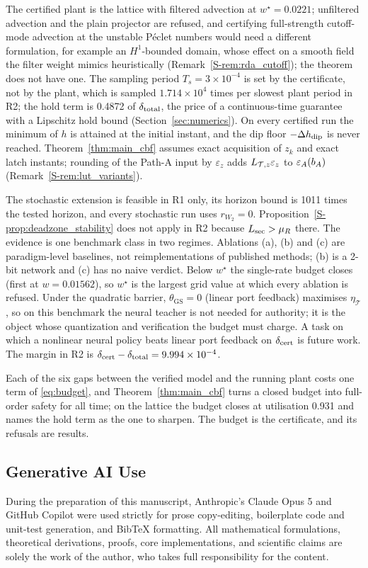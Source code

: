 The certified plant is the lattice with filtered advection at $w^\star = 0.0221$; unfiltered advection and the plain projector are refused, and certifying full-strength cutoff-mode advection at the unstable P\'eclet numbers would need a different formulation, for example an $H^1$-bounded domain, whose effect on a smooth field the filter weight mimics heuristically (Remark~\ref{S-rem:rda_cutoff}); the theorem does not have one. The sampling period $T_s = 3\times10^{-4}$ is set by the certificate, not by the plant, which is sampled $1.714\times10^{4}$ times per slowest plant period in R2; the hold term is 0.4872 of $\delta_{\mathrm{total}}$, the price of a continuous-time guarantee with a Lipschitz hold bound (Section~\ref{sec:numerics}). On every certified run the minimum of $h$ is attained at the initial instant, and the dip floor $-\Delta h_{\mathrm{dip}}$ is never reached. Theorem~\ref{thm:main_cbf} assumes exact acquisition of $z_k$ and exact latch instants; rounding of the Path-A input by $\varepsilon_z$ adds $L_{\mathcal{T},z}\varepsilon_z$ to $\varepsilon_A(b_A)$ (Remark~\ref{S-rem:lut_variants}).

The stochastic extension is feasible in R1 only, its horizon bound is 1011 times the tested horizon, and every stochastic run uses $r_{W_2} = 0$. Proposition~\ref{S-prop:deadzone_stability} does not apply in R2 because $L_{\mathrm{sec}} > \mu_R$ there. The evidence is one benchmark class in two regimes. Ablations (a), (b) and (c) are paradigm-level baselines, not reimplementations of published methods; (b) is a 2-bit network and (c) has no naive verdict. Below $w^\star$ the single-rate budget closes (first at $w = 0.01562$), so $w^\star$ is the largest grid value at which every ablation is refused. Under the quadratic barrier, $\theta_{\mathrm{GS}} = 0$ (linear port feedback) maximises $\eta_{\mathcal{T}}$, so on this benchmark the neural teacher is not needed for authority; it is the object whose quantization and verification the budget must charge. A task on which a nonlinear neural policy beats linear port feedback on $\delta_{\mathrm{cert}}$ is future work. The margin in R2 is $\delta_{\mathrm{cert}} - \delta_{\mathrm{total}} = 9.994\times10^{-4}$.

Each of the six gaps between the verified model and the running plant costs one term of \eqref{eq:budget}, and Theorem~\ref{thm:main_cbf} turns a closed budget into full-order safety for all time; on the lattice the budget closes at utilisation 0.931 and names the hold term as the one to sharpen. The budget is the certificate, and its refusals are results.

\subsection*{Generative AI Use}
During the preparation of this manuscript, Anthropic’s Claude Opus 5 and GitHub Copilot were used strictly for prose copy-editing, boilerplate code and unit-test generation, and BibTeX formatting. All mathematical formulations, theoretical derivations, proofs, core implementations, and scientific claims are solely the work of the author, who takes full responsibility for the content.




